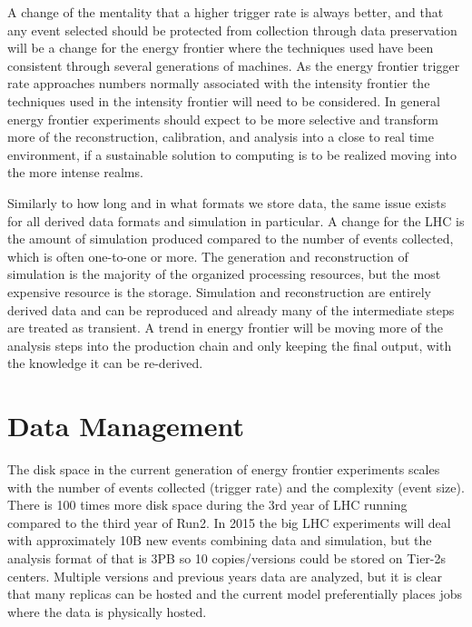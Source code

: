 A change of the mentality that a higher trigger rate is always better,
and that any event selected should be protected from collection
through data preservation will be a change for the energy frontier
where the techniques used have been consistent through several
generations of machines.  As the energy frontier trigger rate
approaches numbers normally associated with the intensity frontier the
techniques used in the intensity frontier will need to be considered.
In general energy frontier experiments should expect to be more
selective and transform more of the reconstruction, calibration, and
analysis into a close to real time environment, if a sustainable
solution to computing is to be realized moving into the more intense
realms.

Similarly to how long and in what formats we store data, the same
issue exists for all derived data formats and simulation in
particular.  A change for the LHC is the amount of simulation produced
compared to the number of events collected, which is often one-to-one
or more.  The generation and reconstruction of simulation is the
majority of the organized processing resources, but the most expensive
resource is the storage.  Simulation and reconstruction are entirely
derived data and can be reproduced and already many of the
intermediate steps are treated as transient.  A trend in energy
frontier will be moving more of the analysis steps into the production
chain and only keeping the final output, with the knowledge it can be
re-derived.


\section{Data Management}
\label{sec:comp-dm}


The disk space in the current generation of energy frontier
experiments scales with the number of events collected (trigger rate)
and the complexity (event size).  There is 100 times more disk space
during the 3rd year of LHC running compared to the third year of Run2.
In 2015 the big LHC experiments will deal with approximately 10B new
events combining data and simulation, but the analysis format of that
is 3PB so 10 copies/versions could be stored on Tier-2s centers.
Multiple versions and previous years data are analyzed, but it is
clear that many replicas can be hosted and the current model
preferentially places jobs where the data is physically hosted.

